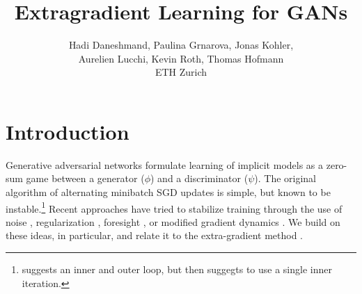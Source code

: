 \documentclass{article}
\title{Extragradient Learning for GANs}
\author{Hadi Daneshmand, Paulina Grnarova, Jonas Kohler, \\
Aurelien Lucchi, Kevin Roth, Thomas Hofmann\\ ETH Zurich}
\begin{document}
\maketitle

\section{Introduction} 

Generative adversarial networks \cite{goodfellow2014generative} formulate learning of implicit models as a zero-sum game between a generator ($\phi$) and a discriminator ($\psi$). The original algorithm of alternating minibatch SGD updates is simple, but known to be instable.\footnote{\cite[Algorithm 1]{goodfellow2014generative} suggests an inner and outer loop, but then suggegts to use a single inner iteration. } Recent approaches have tried to stabilize training through the use of noise \cite{sonderby2016amortised,arjovsky2017towards}, regularization \cite{gulrajani2017improved,roth2017stabilizing}, foresight \cite{metz2016unrolled}, or modified gradient dynamics \cite{mescheder2017numerics,nagarajan2017gradient}. We build on these ideas, in particular, \cite{mescheder2017numerics} and relate it to the extra-gradient method \cite{korpelevich76Extragradient}. 
\end{document}

